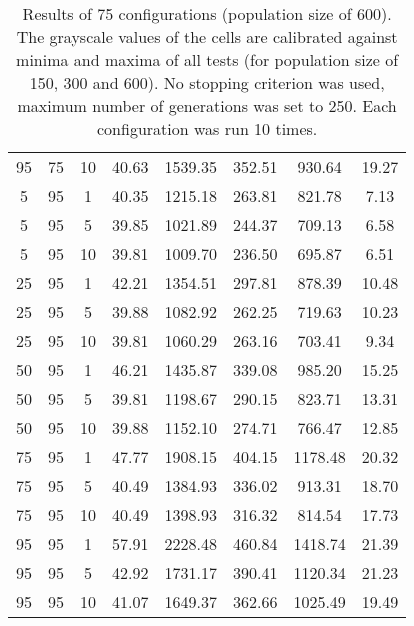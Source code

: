 \begin{table}[h]
\begin{tabular}{ccc|c|c|c|c|c}
95 & 75 & 10 & \cellcolor{gray!42}40.63 & \cellcolor{gray!1}1539.35 & \cellcolor{gray!1}352.51 & \cellcolor{gray!1}930.64 & 19.27\\
5 & 95 & 1 & \cellcolor{gray!45}40.35 & \cellcolor{gray!1}1215.18 & \cellcolor{gray!19}263.81 & \cellcolor{gray!5}821.78 & 7.13\\
5 & 95 & 5 & \cellcolor{gray!50}39.85 & \cellcolor{gray!33}1021.89 & \cellcolor{gray!41}244.37 & \cellcolor{gray!41}709.13 & 6.58\\
5 & 95 & 10 & \cellcolor{gray!50}39.81 & \cellcolor{gray!35}1009.70 & \cellcolor{gray!50}236.50 & \cellcolor{gray!45}695.87 & 6.51\\
25 & 95 & 1 & \cellcolor{gray!26}42.21 & \cellcolor{gray!1}1354.51 & \cellcolor{gray!1}297.81 & \cellcolor{gray!1}878.39 & 10.48\\
25 & 95 & 5 & \cellcolor{gray!50}39.88 & \cellcolor{gray!22}1082.92 & \cellcolor{gray!21}262.25 & \cellcolor{gray!37}719.63 & 10.23\\
25 & 95 & 10 & \cellcolor{gray!50}39.81 & \cellcolor{gray!26}1060.29 & \cellcolor{gray!20}263.16 & \cellcolor{gray!42}703.41 & 9.34\\
50 & 95 & 1 & \cellcolor{gray!1}46.21 & \cellcolor{gray!1}1435.87 & \cellcolor{gray!1}339.08 & \cellcolor{gray!1}985.20 & 15.25\\
50 & 95 & 5 & \cellcolor{gray!50}39.81 & \cellcolor{gray!1}1198.67 & \cellcolor{gray!1}290.15 & \cellcolor{gray!5}823.71 & 13.31\\
50 & 95 & 10 & \cellcolor{gray!50}39.88 & \cellcolor{gray!9}1152.10 & \cellcolor{gray!7}274.71 & \cellcolor{gray!23}766.47 & 12.85\\
75 & 95 & 1 & \cellcolor{gray!1}47.77 & \cellcolor{gray!1}1908.15 & \cellcolor{gray!1}404.15 & \cellcolor{gray!1}1178.48 & 20.32\\
75 & 95 & 5 & \cellcolor{gray!44}40.49 & \cellcolor{gray!1}1384.93 & \cellcolor{gray!1}336.02 & \cellcolor{gray!1}913.31 & 18.70\\
75 & 95 & 10 & \cellcolor{gray!44}40.49 & \cellcolor{gray!1}1398.93 & \cellcolor{gray!1}316.32 & \cellcolor{gray!8}814.54 & 17.73\\
95 & 95 & 1 & \cellcolor{gray!1}57.91 & \cellcolor{gray!1}2228.48 & \cellcolor{gray!1}460.84 & \cellcolor{gray!1}1418.74 & 21.39\\
95 & 95 & 5 & \cellcolor{gray!19}42.92 & \cellcolor{gray!1}1731.17 & \cellcolor{gray!1}390.41 & \cellcolor{gray!1}1120.34 & 21.23\\
95 & 95 & 10 & \cellcolor{gray!38}41.07 & \cellcolor{gray!1}1649.37 & \cellcolor{gray!1}362.66 & \cellcolor{gray!1}1025.49 & 19.49
\end{tabular}
\caption{Results of 75 configurations (population size of 600). The grayscale values of the cells are calibrated against minima and maxima of all tests (for population size of 150, 300 and 600). No stopping criterion was used, maximum number of generations was set to 250. Each configuration was run 10 times.}
\label{tab:res1}
\end{table}

\restoregeometry
